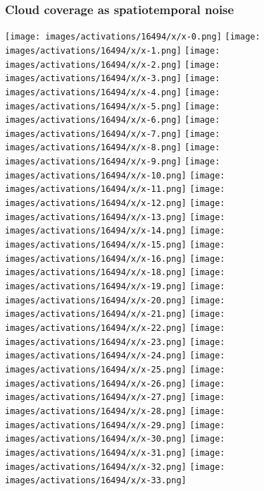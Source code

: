 \documentclass[%
  aspectratio=169,
  9pt,
ngerman,
  light,
  mathserif,
  professionalfont,
  affiliationintitlepagehead,
  titlegraphic,
   affiliation,
   navigationbar,
  progressbar,
]{beamer}
\begin{document}
\begin{frame}
	\frametitle{Cloud coverage as spatiotemporal noise}
	\centering
	
	\def\imagewidth{1.5cm}
	
	\texttt{[image: images/activations/16494/x/x-0.png]}
	\texttt{[image: images/activations/16494/x/x-1.png]}
	\texttt{[image: images/activations/16494/x/x-2.png]}
	\texttt{[image: images/activations/16494/x/x-3.png]}
	\texttt{[image: images/activations/16494/x/x-4.png]}
	\texttt{[image: images/activations/16494/x/x-5.png]}
	\texttt{[image: images/activations/16494/x/x-6.png]}
	\texttt{[image: images/activations/16494/x/x-7.png]}
	\texttt{[image: images/activations/16494/x/x-8.png]}
	\texttt{[image: images/activations/16494/x/x-9.png]}
	\texttt{[image: images/activations/16494/x/x-10.png]}
	\texttt{[image: images/activations/16494/x/x-11.png]}
	\texttt{[image: images/activations/16494/x/x-12.png]}
	\texttt{[image: images/activations/16494/x/x-13.png]}
	\texttt{[image: images/activations/16494/x/x-14.png]}
	\texttt{[image: images/activations/16494/x/x-15.png]}
	\texttt{[image: images/activations/16494/x/x-16.png]}
	\texttt{[image: images/activations/16494/x/x-18.png]}
	\texttt{[image: images/activations/16494/x/x-19.png]}
	\texttt{[image: images/activations/16494/x/x-20.png]}
	\texttt{[image: images/activations/16494/x/x-21.png]}
	\texttt{[image: images/activations/16494/x/x-22.png]}
	\texttt{[image: images/activations/16494/x/x-23.png]}
	\texttt{[image: images/activations/16494/x/x-24.png]}
	\texttt{[image: images/activations/16494/x/x-25.png]}
	\texttt{[image: images/activations/16494/x/x-26.png]}
	\texttt{[image: images/activations/16494/x/x-27.png]}
	\texttt{[image: images/activations/16494/x/x-28.png]}
	\texttt{[image: images/activations/16494/x/x-29.png]}
	\texttt{[image: images/activations/16494/x/x-30.png]}
	\texttt{[image: images/activations/16494/x/x-31.png]}
	\texttt{[image: images/activations/16494/x/x-32.png]}
	\texttt{[image: images/activations/16494/x/x-33.png]}
%	
\end{frame}
%

%		
\end{document}
